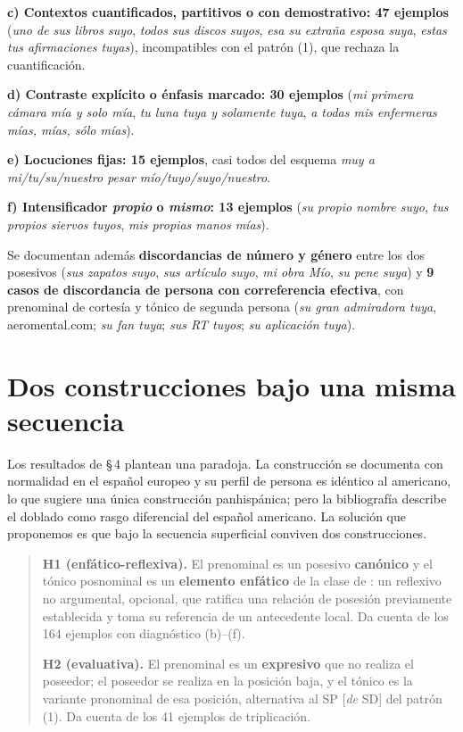 \documentclass[12pt,a4paper]{article}
\begin{document}
\textbf{c) Contextos cuantificados, partitivos o con demostrativo: 47 ejemplos} (\textit{uno de sus libros suyo}, \textit{todos sus discos suyos}, \textit{esa su extraña esposa suya}, \textit{estas tus afirmaciones tuyas}), incompatibles con el patrón (1), que rechaza la cuantificación.

\textbf{d) Contraste explícito o énfasis marcado: 30 ejemplos} (\textit{mi primera cámara mía y solo mía}, \textit{tu luna tuya y solamente tuya}, \textit{a todas mis enfermeras mías, mías, sólo mías}).

\textbf{e) Locuciones fijas: 15 ejemplos}, casi todos del esquema \textit{muy a mi/tu/su/nuestro pesar mío/tuyo/suyo/nuestro}.

\textbf{f) Intensificador \textit{propio} o \textit{mismo}: 13 ejemplos} (\textit{su propio nombre suyo}, \textit{tus propios siervos tuyos}, \textit{mis propias manos mías}).

Se documentan además \textbf{discordancias de número y género} entre los dos posesivos (\textit{sus zapatos suyo}, \textit{sus artículo suyo}, \textit{mi obra Mío}, \textit{su pene suya}) y \textbf{9 casos de discordancia de persona con correferencia efectiva}, con prenominal de cortesía y tónico de segunda persona (\textit{su gran admiradora tuya}, aeromental.com; \textit{su fan tuya}; \textit{sus RT tuyos}; \textit{su aplicación tuya}).

\section{Dos construcciones bajo una misma secuencia}

Los resultados de \S\,4 plantean una paradoja. La construcción se documenta con normalidad en el español europeo y su perfil de persona es idéntico al americano, lo que sugiere una única construcción panhispánica; pero la bibliografía describe el doblado como rasgo diferencial del español americano. La solución que proponemos es que bajo la secuencia superficial conviven dos construcciones.

\begin{quote}
\textbf{H1 (enfático-reflexiva).} El prenominal es un posesivo \textbf{canónico} y el tónico posnominal es un \textbf{elemento enfático} de la clase de \textcite{eguren2023}: un reflexivo no argumental, opcional, que ratifica una relación de posesión previamente establecida y toma su referencia de un antecedente local. Da cuenta de los 164 ejemplos con diagnóstico (b)--(f).

\textbf{H2 (evaluativa).} El prenominal es un \textbf{expresivo} que no realiza el poseedor; el poseedor se realiza en la posición baja, y el tónico es la variante pronominal de esa posición, alternativa al SP [\textit{de} SD] del patrón (1). Da cuenta de los 41 ejemplos de triplicación.
\end{quote}
\end{document}
